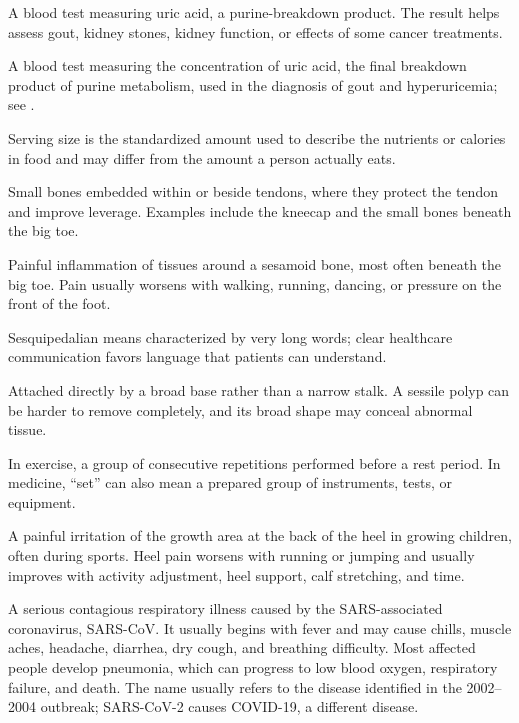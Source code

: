  A blood test measuring uric acid, a purine-breakdown product. The result helps assess gout, kidney stones, kidney function, or effects of some cancer treatments.

 A blood test measuring the concentration of uric acid, the final breakdown product of purine metabolism, used in the diagnosis of gout and hyperuricemia; see .

 Serving size is the standardized amount used to describe the nutrients or calories in food and may differ from the amount a person actually eats.

 Small bones embedded within or beside tendons, where they protect the tendon and improve leverage. Examples include the kneecap and the small bones beneath the big toe.

 Painful inflammation of tissues around a sesamoid bone, most often beneath the big toe. Pain usually worsens with walking, running, dancing, or pressure on the front of the foot.

 Sesquipedalian means characterized by very long words; clear healthcare communication favors language that patients can understand.

 Attached directly by a broad base rather than a narrow stalk. A sessile polyp can be harder to remove completely, and its broad shape may conceal abnormal tissue.

 In exercise, a group of consecutive repetitions performed before a rest period. In medicine, “set” can also mean a prepared group of instruments, tests, or equipment.

 A painful irritation of the growth area at the back of the heel in growing children, often during sports. Heel pain worsens with running or jumping and usually improves with activity adjustment, heel support, calf stretching, and time.

 A serious contagious respiratory illness caused by the SARS-associated coronavirus, SARS-CoV. It usually begins with fever and may cause chills, muscle aches, headache, diarrhea, dry cough, and breathing difficulty. Most affected people develop pneumonia, which can progress to low blood oxygen, respiratory failure, and death. The name usually refers to the disease identified in the 2002--2004 outbreak; SARS-CoV-2 causes COVID-19, a different disease.

